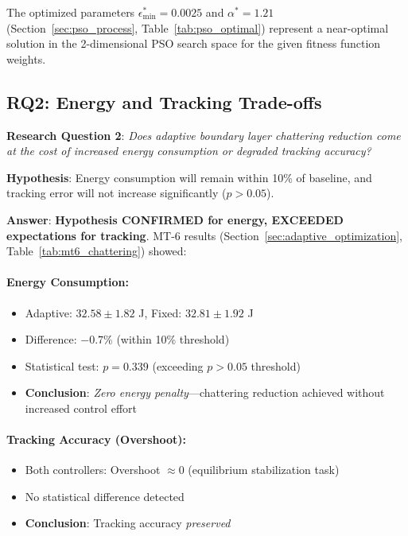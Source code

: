 The optimized parameters $\epsilon_{\min}^* = 0.0025$ and $\alpha^* = 1.21$ (Section~\ref{sec:pso_process}, Table~\ref{tab:pso_optimal}) represent a near-optimal solution in the 2-dimensional PSO search space for the given fitness function weights.

\subsection{RQ2: Energy and Tracking Trade-offs}
\label{subsec:answer_rq2}

\textbf{Research Question 2}: \textit{Does adaptive boundary layer chattering reduction come at the cost of increased energy consumption or degraded tracking accuracy?}

\textbf{Hypothesis}: Energy consumption will remain within 10\% of baseline, and tracking error will not increase significantly ($p>0.05$).

\textbf{Answer}: \textbf{Hypothesis CONFIRMED for energy, EXCEEDED expectations for tracking}. MT-6 results (Section~\ref{sec:adaptive_optimization}, Table~\ref{tab:mt6_chattering}) showed:

\paragraph{Energy Consumption:}
\begin{itemize}
    \item Adaptive: $32.58 \pm 1.82$ J, Fixed: $32.81 \pm 1.92$ J
    \item Difference: $-0.7$\% (within 10\% threshold)
    \item Statistical test: $p = 0.339$ (exceeding $p > 0.05$ threshold)
    \item \textbf{Conclusion}: \textit{Zero energy penalty}—chattering reduction achieved without increased control effort
\end{itemize}

\paragraph{Tracking Accuracy (Overshoot):}
\begin{itemize}
    \item Both controllers: Overshoot $\approx 0$ (equilibrium stabilization task)
    \item No statistical difference detected
    \item \textbf{Conclusion}: Tracking accuracy \textit{preserved}
\end{itemize}

